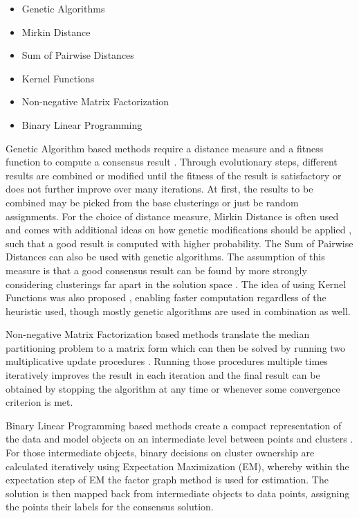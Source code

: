 \documentclass[
	a4paper,
	english,
	twoside,
	openright,               
	11pt                            
	]{report}
\begin{document}
\begin{itemize}
  \item Genetic Algorithms
  \item Mirkin Distance
  \item Sum of Pairwise Distances
  \item Kernel Functions
  \item Non-negative Matrix Factorization
  \item Binary Linear Programming
\end{itemize}

Genetic Algorithm based methods require a distance measure and a fitness function to compute a consensus result \cite{Cristofor2002FindingMP}. Through evolutionary steps, different results are combined or modified until the fitness of the result is satisfactory or does not further improve over many iterations. At first, the results to be combined may be picked from the base clusterings or just be random assignments. For the choice of distance measure, Mirkin Distance is often used and comes with additional ideas on how genetic modifications should be applied \cite{5766165}, such that a good result is computed with higher probability. The Sum of Pairwise Distances can also be used with genetic algorithms. The assumption of this measure is that a good consensus result can be found by more strongly considering clusterings far apart in the solution space \cite{6694095}. The idea of using Kernel Functions was also proposed \cite{Vega-Pons:2010:WPC:1786814.1787121}, enabling faster computation regardless of the heuristic used, though mostly genetic algorithms are used in combination as well.

Non-negative Matrix Factorization based methods translate the median partitioning problem to a matrix form which can then be solved by running two multiplicative update procedures \cite{Li:2007:SCS:1441428.1442121}. Running those procedures multiple times iteratively improves the result in each iteration and the final result can be obtained by stopping the algorithm at any time or whenever some convergence criterion is met.

Binary Linear Programming based methods create a compact representation of the data and model objects on an intermediate level between points and clusters \cite{HUANG2016131}. For those intermediate objects, binary decisions on cluster ownership are calculated iteratively using Expectation Maximization (EM), whereby within the expectation step of EM the factor graph method \cite{HUANG2016131} is used for estimation. The solution is then mapped back from intermediate objects to data points, assigning the points their labels for the consensus solution.
\end{document}
